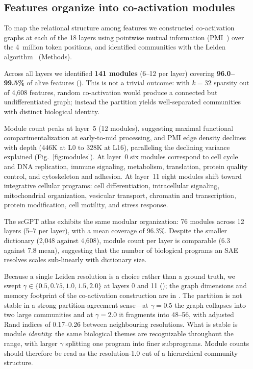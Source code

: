 \documentclass[onecolumn,11pt]{article}
\begin{document}
\subsection*{Features organize into co-activation modules}
\label{sec:modules}

To map the relational structure among features we constructed co-activation graphs at each of the
18 layers using pointwise mutual information (PMI~\cite{manning1999foundations}) over the 4~million
token positions, and identified communities with the Leiden algorithm~\cite{traag2019louvain}
(Methods).

Across all layers we identified \textbf{141 modules} (6--12 per layer) covering
\textbf{96.0--99.5\%} of alive features (). This is not a trivial outcome: with $k{=}32$ sparsity out
of 4,608 features, random co-activation would produce a connected but undifferentiated graph;
instead the partition yields well-separated communities with distinct biological identity.

Module count peaks at layer~5 (12 modules), suggesting maximal functional compartmentalization at
early-to-mid processing, and PMI edge density declines with depth (446K at L0 to 328K at L16),
paralleling the declining variance explained (Fig.~\ref{fig:modules}). At layer~0 six modules
correspond to cell cycle and DNA replication, immune signaling, metabolism, translation, protein
quality control, and cytoskeleton and adhesion. At layer~11 eight modules shift toward integrative
cellular programs: cell differentiation, intracellular signaling, mitochondrial organization,
vesicular transport, chromatin and transcription, protein modification, cell motility, and stress
response.

The scGPT atlas exhibits the same modular organization: 76 modules across 12 layers (5--7 per
layer), with a mean coverage of 96.3\%. Despite the smaller dictionary (2,048 against 4,608),
module count per layer is comparable (6.3 against 7.8 mean), suggesting that the number of
biological programs an SAE resolves scales sub-linearly with dictionary size.

Because a single Leiden resolution is a choice rather than a ground truth, we swept
$\gamma \in \{0.5, 0.75, 1.0, 1.5, 2.0\}$ at layers 0 and 11 (); the graph
dimensions and memory footprint of the co-activation construction are in . The partition is not stable in a
strong partition-agreement sense---at $\gamma{=}0.5$ the graph collapses into two large
communities and at $\gamma{=}2.0$ it fragments into 48--56, with adjusted Rand indices of 0.17--0.26
between neighbouring resolutions. What is stable is module \emph{identity}: the same biological
themes are recognizable throughout the range, with larger $\gamma$ splitting one program into
finer subprograms. Module counts should therefore be read as the resolution-1.0 cut of a
hierarchical community structure.
\end{document}
